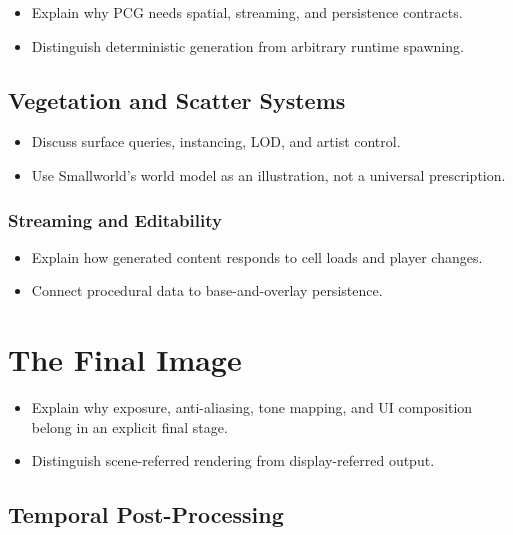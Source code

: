 \documentclass[
  11pt,
  letterpaper,
  DIV=11,
  numbers=noendperiod,
  twoside,
  open=right]{scrreprt}
\providecommand{\tightlist}{%
  \setlength{\itemsep}{0pt}\setlength{\parskip}{0pt}}
\begin{document}
\begin{itemize}
\tightlist
\item
  Explain why PCG needs spatial, streaming, and persistence contracts.
\item
  Distinguish deterministic generation from arbitrary runtime spawning.
\end{itemize}

\subsection{Vegetation and Scatter
Systems}\label{vegetation-and-scatter-systems}

\begin{itemize}
\tightlist
\item
  Discuss surface queries, instancing, LOD, and artist control.
\item
  Use Smallworld's world model as an illustration, not a universal
  prescription.
\end{itemize}

\subsubsection{Streaming and
Editability}\label{streaming-and-editability}

\begin{itemize}
\tightlist
\item
  Explain how generated content responds to cell loads and player
  changes.
\item
  Connect procedural data to base-and-overlay persistence.
\end{itemize}

\section{The Final Image}\label{the-final-image}

\begin{itemize}
\tightlist
\item
  Explain why exposure, anti-aliasing, tone mapping, and UI composition
  belong in an explicit final stage.
\item
  Distinguish scene-referred rendering from display-referred output.
\end{itemize}

\subsection{Temporal Post-Processing}\label{temporal-post-processing}
\end{document}
